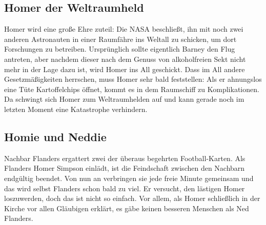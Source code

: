 	
\subsection{Homer der Weltraumheld}\label{1F13}
Homer wird eine große Ehre zuteil: Die NASA beschließt, ihn mit noch zwei anderen Astronauten in einer Raumfähre ins Weltall zu schicken, um dort Forschungen zu betreiben. Ursprünglich sollte eigentlich Barney den Flug antreten, aber nachdem dieser nach dem Genuss von alkoholfreien Sekt nicht mehr in der Lage dazu ist, wird Homer ins All geschickt. Dass im All andere Gesetzmäßigkeiten herrschen, muss Homer sehr bald feststellen: Als er ahnungslos eine Tüte Kartoffelchips öffnet, kommt es in dem Raumschiff zu Komplikationen. Da schwingt sich Homer zum Weltraumhelden auf und kann gerade noch im letzten Moment eine Katastrophe verhindern.

	
\subsection{Homie und Neddie}
Nachbar Flanders ergattert zwei der überaus begehrten Football-Karten. Als Flanders Homer Simpson einlädt, ist die Feindschaft zwischen den Nachbarn endgültig beendet. Von nun an verbringen sie jede freie Minute gemeinsam und das wird selbst Flanders schon bald zu viel. Er versucht, den lästigen Homer loszuwerden, doch das ist nicht so einfach. Vor allem, als Homer schließlich in der Kirche vor allen Gläubigen erklärt, es gäbe keinen besseren Menschen als Ned Flanders.

